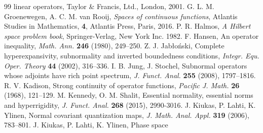\documentclass[reqno]{amsproc}
\numberwithin{equation}{section}
\theoremstyle{remark}
\theoremstyle{definition}
\begin{document}
\begin{thebibliography}{99}
{linear operators}, Taylor \& Francis, Ltd.,
London, 2001.
    G. L. M. Groenewegen, A. C. M. van Rooij,
{\em Spaces of continuous functions},
Atlantis Studies in Mathematics, {\bf 4},
Atlantis Press, Paris, 2016.
    P. R. Halmos, {\em A Hilbert space problem
book}, Springer-Verlag, New York Inc. 1982.
F. Hansen, An operator inequality, {\em
Math. Ann.} {\bf 246} (1980), 249--250.
Z. J. Jab{\l}o\'{n}ski, Complete
hyperexpansivity, subnormality and inverted
boundedness conditions, {\em Integr. Equ.
Oper. Theory} {\bf 44} (2002), 316--336.
I. B. Jung, J. Stochel, Subnormal operators
whose adjoints have rich point spectrum,
{\em J. Funct. Anal.} {\bf 255} (2008),
1797--1816.
     R. V. Kadison, Strong continuity of operator
functions, {\em Pacific J. Math.} {\bf 26} (1968),
121--129.
M. Kennedy, O. M. Shalit, Essential
normality, essential norms and
hyperrigidity, {\em J. Funct. Anal.} {\bf
268} (2015), 2990-3016.
J. Kiukas, P. Lahti, K. Ylinen, Normal
covariant quantization maps, {\em J. Math.
Anal. Appl.} {\bf 319} (2006), 783--801.
J. Kiukas, P. Lahti, K. Ylinen, Phase space

\end{thebibliography}
\end{document}
